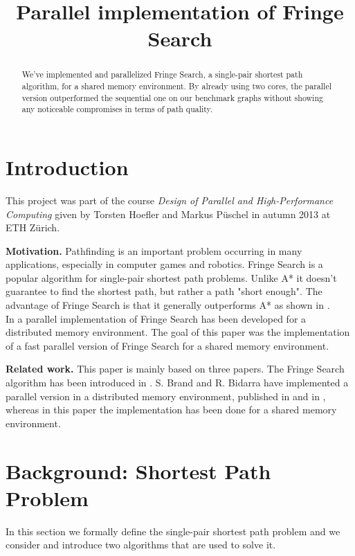 \documentclass[letterpaper]{article}
\title{Parallel implementation of Fringe Search}
\newcommand{\mypar}[1]{{\bf #1.}}
\begin{document}
%
\maketitle
%

\begin{abstract}
We've implemented and parallelized Fringe Search, a single-pair shortest path algorithm, for a shared memory environment. By already using two cores, the parallel version outperformed the sequential one on our benchmark graphs without showing any noticeable compromises in terms of path quality.
\end{abstract}

\section{Introduction}\label{sec:intro}

This project was part of the course \textit{Design of Parallel and High-Performance Computing} given by Torsten Hoefler and Markus Püschel in autumn 2013 at ETH Zürich.


\mypar{Motivation} 
Pathfinding is an important problem occurring in many applications, especially in computer games and robotics. Fringe Search is a popular algorithm for single-pair shortest path problems. Unlike A* it doesn't guarantee to find the shortest path, but rather a path "short enough". The advantage of Fringe Search is that it generally outperforms A* as shown in \cite{fringe:05}.\\
In \cite{brand:09} a parallel implementation of Fringe Search has been developed for a distributed memory environment. The goal of this paper was the implementation of a fast parallel version of Fringe Search for a shared memory environment.

\mypar{Related work} This paper is mainly based on three papers. The Fringe Search algorithm has been introduced in \cite{fringe:05}. S. Brand and R. Bidarra have implemented a parallel version in a distributed memory environment, published in \cite{brand:09} and in \cite{brand:12}, whereas in this paper the implementation has been done for a shared memory environment.

\section{Background: Shortest Path Problem}\label{sec:background}
In this section we formally define the single-pair shortest path problem and we consider and introduce two algorithms that are used to solve it.
\end{document}
